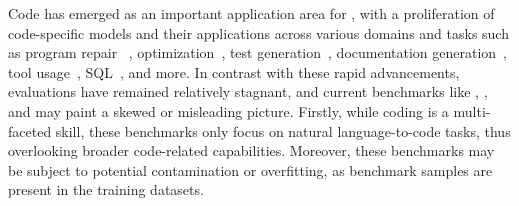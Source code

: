 
Code has emerged as an important application area for \llms{}, with a proliferation of code-specific models 
\citep{chen2021evaluating,austin2021program,li2022competition,zhong2022codegen, allal2023santacoder, li2023starcoder, roziere2023code, deepseek-coder, luo2023wizardcoder, Phind, wei2023magicoder, ridnik2024code,starcoder2} and their applications across various domains and tasks such as program repair ~\citep{opencodeinterpreter, olausson2023demystifying}, optimization~\citep{madaan2023learning}, test generation~\citep{steenhoek2023reinforcement}, documentation generation~\citep{luo2024repoagent}, tool usage~\citep{patil2023gorilla, qin2024toolllm}, SQL~\citep{sun2023sql}, and more.
In contrast with these rapid advancements, evaluations have remained relatively stagnant, and current benchmarks like 
\humaneval{}, \mbpp{}, and \apps{} may paint a skewed or misleading picture.
Firstly, while coding is a multi-faceted skill, these benchmarks only focus on natural language-to-code tasks, thus overlooking broader code-related capabilities. 
Moreover, these benchmarks may be subject to potential contamination or overfitting, as benchmark samples are present in the training datasets.



